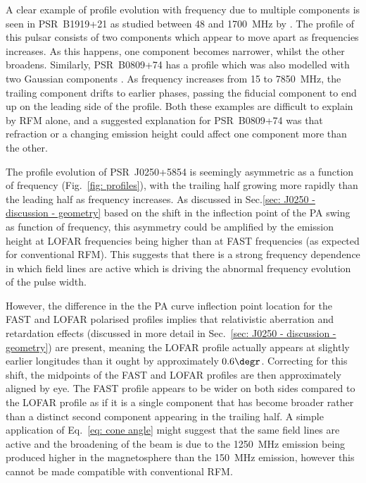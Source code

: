 A clear example of profile evolution with frequency due to multiple components is seen in PSR~B1919+21 as studied between 48 and 1700~MHz by \citet{HSH+2012}. The profile of this pulsar consists of two components which appear to move apart as frequencies increases. As this happens, one component becomes narrower, whilst the other broadens. Similarly, PSR~B0809+74 has a profile which was also modelled with two Gaussian components \citep{HSH+2012}. As frequency increases from 15 to 7850~MHz, the trailing component drifts to earlier phases, passing the fiducial component to end up on the leading side of the profile. Both these examples are difficult to explain by RFM alone, and a suggested explanation for PSR~B0809+74 was that refraction or a changing emission height could affect one component more than the other.

The profile evolution of PSR~J0250+5854 is seemingly asymmetric as a function of frequency (Fig.~\ref{fig: profiles}), with the trailing half growing more rapidly than the leading half as frequency increases. As discussed in Sec.\ref{sec: J0250 - discussion - geometry} based on the shift in the inflection point of the PA swing as function of frequency, this asymmetry could be amplified by the emission height at LOFAR frequencies being higher than at FAST frequencies (as expected for conventional RFM). This suggests that there is a strong frequency dependence in which field lines are active which is driving the abnormal frequency evolution of the pulse width.

However, the difference in the the PA curve inflection point location for the FAST and LOFAR polarised profiles implies that relativistic aberration and retardation effects (discussed in more detail in Sec.~\ref{sec: J0250 - discussion - geometry}) are present, meaning the LOFAR profile actually appears at slightly earlier longitudes than it ought by approximately $0.6\degr$. Correcting for this shift, the midpoints of the FAST and LOFAR profiles are then approximately aligned by eye. The FAST profile appears to be wider on both sides compared to the LOFAR profile as if it is a single component that has become broader rather than a distinct second component appearing in the trailing half. A simple application of Eq.~\eqref{eq: cone angle} might suggest that the same field lines are active and the broadening of the beam is due to the 1250~MHz emission being produced higher in the magnetosphere than the 150~MHz emission, however this cannot be made compatible with conventional RFM. 

